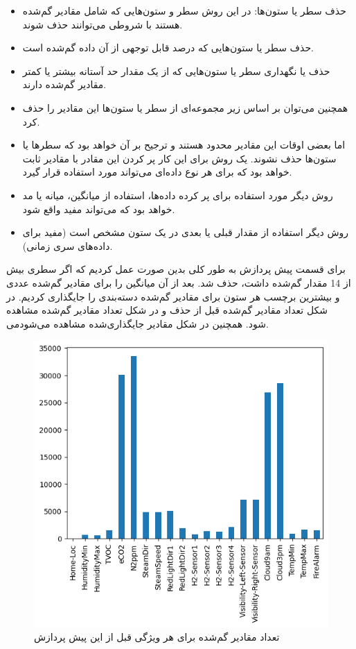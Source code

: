 \documentclass{article}
\begin{document}
\begin{itemize}
    \item حذف سطر یا ستون‌ها: در این روش سطر و ستون‌هایی که شامل مقادیر گم‌شده هستند با شروطی می‌توانند حذف شوند.
    \item حذف سطر یا ستون‌هایی که درصد قابل توجهی از آن داده گم‌شده است.
    \item حذف یا نگهداری سطر یا ستون‌هایی که از یک مقدار حد آستانه بیشتر یا کمتر مقادیر گم‌شده دارند.
    \item همچنین می‌توان بر اساس زیر مجموعه‌ای از سطر یا ستون‌ها این مقادیر را حذف کرد.
    \item اما بعضی اوقات این مقادیر محدود هستند و ترجیح بر آن خواهد بود که سطرها یا ستون‌ها حذف نشوند. یک روش برای این کار پر کردن این مقادر با مقادیر ثابت خواهد بود که برای هر نوع داده‌ای می‌تواند مورد استفاده قرار گیرد.
    \item روش دیگر مورد استفاده برای پر کرده داده‌ها، استفاده از میانگین، میانه یا مد خواهد بود که می‌تواند مفید واقع شود.
    \item روش دیگر استفاده از مقدار قبلی یا بعدی در یک ستون مشخص است (مفید برای داده‌های سری زمانی).
\end{itemize}

برای قسمت پیش پردازش به طور کلی بدین صورت عمل کردیم که اگر سطری بیش از 14 مقدار گم‌شده داشت، حذف شد. بعد از آن میانگین را برای مقادیر گم‌شده عددی و بیشترین برچسب هر ستون برای مقادیر گم‌شده دسته‌بندی را جایگذاری کردیم. در شکل تعداد مقادیر گم‌شده قبل از حذف و در شکل تعداد مقادیر گم‌شده مشاهده می‎‌شود. همچنین در شکل مقادیر جایگذاری‌شده مشاهده می‌شود.

\begin{figure}[!h]
    \centering\includegraphics[scale=.55]{./p1-1}
    \caption{تعداد مقادیر گم‌شده برای هر ویژگی قبل از این پیش پردازش}\label{fig.11}
\end{figure}
\end{document}
